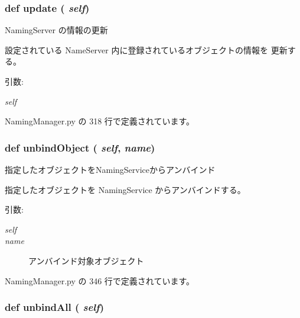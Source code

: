 \subsubsection{\setlength{\rightskip}{0pt plus 5cm}def update ( {\em self})}\label{classsource__py_1_1_naming_manager_1_1_naming_manager_be52b977c101e59f342489ed18140819}


NamingServer の情報の更新 

設定されている NameServer 内に登録されているオブジェクトの情報を 更新する。

\begin{Desc}
\item[引数:]
\begin{description}
\item[{\em self}]\end{description}
\end{Desc}


 NamingManager.py の 318 行で定義されています。
\subsubsection{\setlength{\rightskip}{0pt plus 5cm}def unbindObject ( {\em self},  {\em name})}\label{classsource__py_1_1_naming_manager_1_1_naming_manager_43222960adbbcec1478c036cd9de4217}


指定したオブジェクトをNamingServiceからアンバインド 

指定したオブジェクトを NamingService からアンバインドする。

\begin{Desc}
\item[引数:]
\begin{description}
\item[{\em self}]\item[{\em name}]アンバインド対象オブジェクト \end{description}
\end{Desc}


 NamingManager.py の 346 行で定義されています。
\subsubsection{\setlength{\rightskip}{0pt plus 5cm}def unbindAll ( {\em self})}\label{classsource__py_1_1_naming_manager_1_1_naming_manager_cc80d5a0165525c2e156ad0e9c866736}


